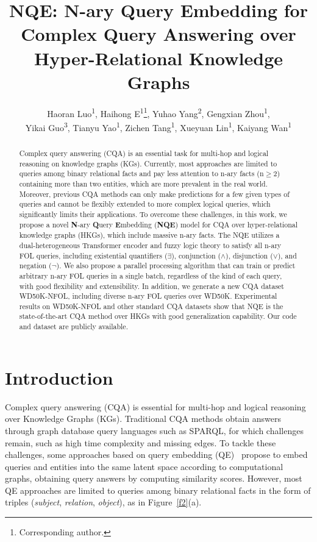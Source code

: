 \documentclass[letterpaper]{article} \usepackage{aaai23}  \usepackage{times}  \usepackage{helvet}  \usepackage{courier}  \usepackage[hyphens]{url}  \usepackage{graphicx} \urlstyle{rm} \def\UrlFont{\rm}  \usepackage{natbib}  \usepackage{caption} \frenchspacing  \setlength{\pdfpagewidth}{8.5in}  \setlength{\pdfpageheight}{11in}  \usepackage{algorithm}
\title{NQE: N-ary Query Embedding for Complex Query Answering over Hyper-Relational Knowledge Graphs}
\author{
Haoran Luo\textsuperscript{\rm 1},
    Haihong E\textsuperscript{\rm 1}\thanks{Corresponding author.},
    Yuhao Yang\textsuperscript{\rm 2},
    Gengxian Zhou\textsuperscript{\rm 1},\\
    Yikai Guo\textsuperscript{\rm 3},
    Tianyu Yao\textsuperscript{\rm 1},
    Zichen Tang\textsuperscript{\rm 1},
    Xueyuan Lin\textsuperscript{\rm 1},
    Kaiyang Wan\textsuperscript{\rm 1}
}
\begin{document}
\maketitle

\begin{abstract}
Complex query answering (CQA) is an essential task for multi-hop and logical reasoning on knowledge graphs (KGs). Currently, most approaches are limited to queries among binary relational facts and pay less attention to n-ary facts (n$\geq$2) containing more than two entities, which are more prevalent in the real world. Moreover, previous CQA methods can only make predictions for a few given types of queries and cannot be flexibly extended to more complex logical queries, which significantly limits their applications. To overcome these challenges, in this work, we propose a novel \textbf{N}-ary \textbf{Q}uery \textbf{E}mbedding (\textbf{NQE}) model for CQA over hyper-relational knowledge graphs (HKGs), which include massive n-ary facts. The NQE utilizes a dual-heterogeneous Transformer encoder and fuzzy logic theory to satisfy all n-ary FOL queries, including existential quantifiers ($\exists$), conjunction ($\wedge$), disjunction ($\vee$), and negation ($\neg$). We also propose a parallel processing algorithm that can train or predict arbitrary n-ary FOL queries in a single batch, regardless of the kind of each query, with good flexibility and extensibility. In addition, we generate a new CQA dataset WD50K-NFOL, including diverse n-ary FOL queries over WD50K. Experimental results on WD50K-NFOL and other standard CQA datasets show that NQE is the state-of-the-art CQA method over HKGs with good generalization capability. Our code and dataset are publicly available.
\end{abstract}


\section{Introduction}


Complex query answering (CQA) is essential for multi-hop and logical reasoning over Knowledge Graphs (KGs). Traditional CQA methods obtain answers through graph database query languages such as SPARQL, for which challenges remain, such as high time complexity and missing edges. To tackle these challenges, some approaches based on query embedding (QE)~\citep{GQE,Q2B,BetaE,CQD,ConE,FLEX,FuzzQE} propose to embed queries and entities into the same latent space according to computational graphs, obtaining query answers by computing similarity scores. However, most QE approaches are limited to queries among binary relational facts in the form of triples (\textit{subject}, \textit{relation}, \textit{object}), as in Figure~\ref{f2}(a).
\end{document}
